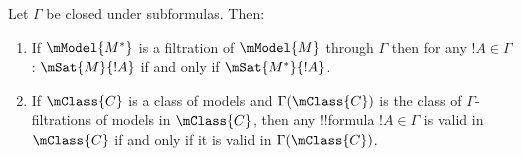 \documentclass[../../../include/open-logic-section]{subfiles}
\begin{document}
\begin{cor}
  Let $\Gamma$ be closed under subformulas. Then:
  \begin{enumerate}
  \item If $\mModel{M^*}$ is a filtration of $\mModel{M}$ through
    $\Gamma$ then for any $!A \in \Gamma$: $\mSat{M}{!A}$ if and only
    if $\mSat{M^*}{!A}$.
  \item If $\mClass{C}$ is a class of models and $\Gamma(\mClass{C})$
    is the class of $\Gamma$-filtrations of models in $\mClass{C}$,
    then any !!{formula} $!A \in \Gamma$ is valid in $\mClass{C}$ if
    and only if it is valid in $\Gamma(\mClass{C})$.
  \end{enumerate}
\end{cor}
\end{document}
